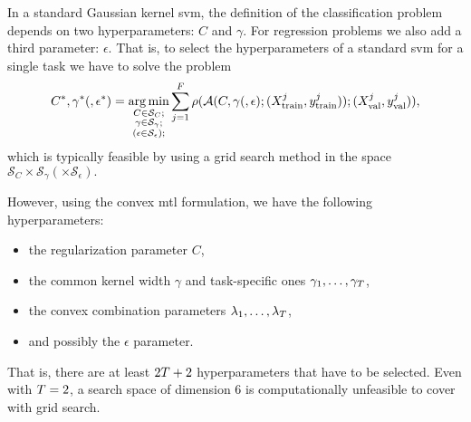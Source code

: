 %
In a standard Gaussian kernel \acrshort{svm}, the definition of the classification problem depends on two hyperparameters: $C$ and $\gamma$.
For regression problems we also add a third parameter: $\epsilon$. 
That is, to select the hyperparameters of a standard \acrshort{svm} for a single task we have to solve the problem
\begin{equation}
    \nonumber
    C^*, \gamma^* (, \epsilon^*) = \operatorname*{arg\min}_{\substack{C \in \mathcal{S}_C ; \\ \substack{\gamma \in \mathcal{S}_\gamma} ; \\ \left(\substack{\epsilon \in \mathcal{S}_\epsilon} \right); }}
     \sum_{j=1}^{F} \rho(\mathcal{A}(C, \gamma (, \epsilon); (X^j_\text{train}, y^j_\text{train})); (X^j_\text{val}, y^j_\text{val})) ,
\end{equation}
which is typically feasible by using a grid search method in the space $\mathcal{S}_{C} \times \mathcal{S}_{\gamma} (\times \mathcal{S}_{\epsilon}) .$
%

However, using the convex \acrshort{mtl} formulation, 
we have the following hyperparameters: 
\begin{itemize}
    \item the regularization parameter $C$,
    \item the common kernel width $\gamma$ and task-specific ones $\gamma_1, \ldots, \gamma_T$,
    \item the convex combination parameters $\lambda_1, \ldots, \lambda_T$,
    \item and possibly the $\epsilon$ parameter.
\end{itemize}
That is, there are at least $2T + 2$ hyperparameters that have to be selected. Even with $T=2$, a search space of dimension $6$ is computationally unfeasible to cover with grid search.

